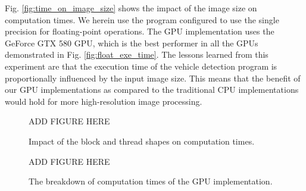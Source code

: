 Fig. \ref{fig:time_on_image_size} shows the impact of the image size on
computation times. 
We herein use the program configured to use the single precision for
floating-point operations.
The GPU implementation uses the GeForce GTX 580 GPU, which is the best
performer in all the GPUs demonstrated in Fig. \ref{fig:float_exe_time}.
The lessons learned from this experiment are that the execution time of
the vehicle detection program is proportionally influenced by the input
image size.
This means that the benefit of our GPU implementations as compared to
the traditional CPU implementations would hold for more high-resolution
image processing.

\begin{figure}[t]
 \begin{center}
  ADD FIGURE HERE 
  \caption{Impact of the block and thread shapes on computation times.}
  \label{fig:time_on_block_thread_shapes}
 \end{center}
\end{figure}


\begin{figure}[t]
 \begin{center}
  ADD FIGURE HERE 
  \caption{The breakdown of computation times of the GPU implementation.}
  \label{fig:breakdown_gpu}
 \end{center}
\end{figure}

